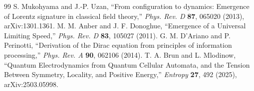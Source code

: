 \documentclass[11pt,a4paper]{article}
\begin{document}
\begin{thebibliography}{99}
 S. Mukohyama and J.-P. Uzan, ``From configuration to dynamics: Emergence of Lorentz signature in classical field theory,'' \emph{Phys. Rev. D} \textbf{87}, 065020 (2013), arXiv:1301.1361.
 M. M. Anber and J. F. Donoghue, ``Emergence of a Universal Limiting Speed,'' \emph{Phys. Rev. D} \textbf{83}, 105027 (2011).
 G. M. D'Ariano and P. Perinotti, ``Derivation of the Dirac equation from principles of information processing,'' \emph{Phys. Rev. A} \textbf{90}, 062106 (2014).
 T. A. Brun and L. Mlodinow, ``Quantum Electrodynamics from Quantum Cellular Automata, and the Tension Between Symmetry, Locality, and Positive Energy,'' \emph{Entropy} \textbf{27}, 492 (2025), arXiv:2503.05998.
\end{thebibliography}
\end{document}
